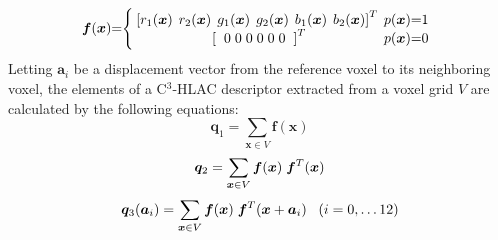 \documentclass[a4paper, 10 pt, conference]{sty/ieeeconf}
\begin{document}
\begin{eqnarray*}
  \bm{f}({\bm x})\hspace{-1mm}=\hspace{-1mm}\left\{
  \begin{array}{cc}
    \hspace{-1mm}
    \left[r_1({\bm x})\hspace{1.5mm} r_2(\bm{x}) \hspace{1.5mm}g_1({\bm x}) \hspace{1.5mm}g_2({\bm x}) \hspace{1.5mm}b_1({\bm x}) \hspace{1.5mm}b_2({\bm x})\right]^T & \hspace{-2mm}p({\bm x})\hspace{-1mm}=\hspace{-1mm}1 \\
    \left[\hspace{2mm} 0\hspace{1mm}0\hspace{1mm}0\hspace{1mm}0\hspace{1mm}0\hspace{1mm}0 \hspace{2mm} \right]^T & \hspace{-2mm}p({\bm x})\hspace{-1mm}=\hspace{-1mm}0
  \end{array}\right.
\end{eqnarray*}
%
Letting ${\bm a_i}$ be a displacement vector from the reference voxel to its neighboring voxel, 
the elements of a C$^3$-HLAC descriptor extracted from a voxel grid $V$ are calculated by the following equations:
\begin{equation}\label{eq:0th}
  {\bm q_1} = \sum_{{\bm x} \in V} \bm{f}({\bm x})
\end{equation}
\begin{equation}\label{eq:0th_1}
  {\bm q_2} = \sum_{{\bm x} \in V} \bm{f}({\bm x}) \hspace{1mm}\bm{f}^T({\bm x}) \\
\end{equation}
\begin{equation}\label{eq:1st}
  {\bm q_3}({\bm a}_i) = \sum_{{\bm x} \in V} \bm{f}({\bm x}) \hspace{1mm}\bm{f}^T({\bm x}+{\bm a_i}) \;\;\; (i=0, \dots 12) \\
\end{equation}
\end{document}
